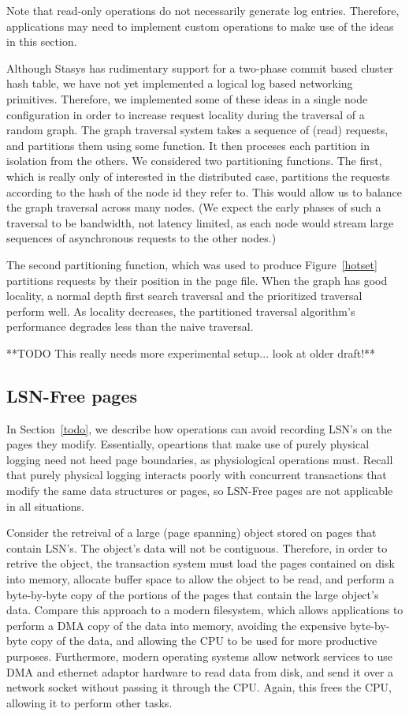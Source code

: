 \documentclass[letterpaper,twocolumn,10pt]{article}
\newcommand{\yad}{Stasys\xspace}
\begin{document}
Note that read-only operations do not necessarily generate log
entries.  Therefore, applications may need to implement custom
operations to make use of the ideas in this section.

Although \yad has rudimentary support for a two-phase commit based
cluster hash table, we have not yet implemented a logical log based
networking primitives.  Therefore, we implemented some of these ideas
in a single node configuration in order to increase request locality
during the traversal of a random graph.  The graph traversal system
takes a sequence of (read) requests, and partitions them using some
function.  It then proceses each partition in isolation from the
others.  We considered two partitioning functions.  The first, which
is really only of interested in the distributed case, partitions the
requests according to the hash of the node id they refer to.  This
would allow us to balance the graph traversal across many nodes.  (We
expect the early phases of such a traversal to be bandwidth, not
latency limited, as each node would stream large sequences of
asynchronous requests to the other nodes.) 

The second partitioning function, which was used to produce
Figure~\ref{hotset} partitions requests by their position in the page
file.  When the graph has good locality, a normal depth first search
traversal and the prioritized traversal perform well.  As locality
decreases, the partitioned traversal algorithm's performance degrades
less than the naive traversal.

**TODO This really needs more experimental setup... look at older draft!**

\subsection{LSN-Free pages}

In Section~\ref{todo}, we describe how operations can avoid recording
LSN's on the pages they modify.  Essentially, opeartions that make use
of purely physical logging need not heed page boundaries, as
physiological operations must.  Recall that purely physical logging
interacts poorly with concurrent transactions that modify the same
data structures or pages, so LSN-Free pages are not applicable in all
situations.

Consider the retreival of a large (page spanning) object stored on
pages that contain LSN's.  The object's data will not be contiguous.
Therefore, in order to retrive the object, the transaction system must
load the pages contained on disk into memory, allocate buffer space to
allow the object to be read, and perform a byte-by-byte copy of the
portions of the pages that contain the large object's data.  Compare
this approach to a modern filesystem, which allows applications to
perform a DMA copy of the data into memory, avoiding the expensive
byte-by-byte copy of the data, and allowing the CPU to be used for
more productive purposes.  Furthermore, modern operating systems allow
network services to use DMA and ethernet adaptor hardware to read data
from disk, and send it over a network socket without passing it
through the CPU.  Again, this frees the CPU, allowing it to perform
other tasks.
\end{document}
